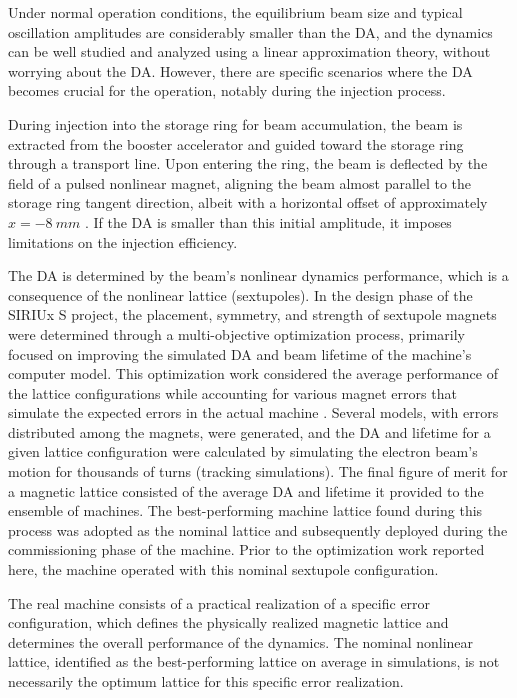 Under normal operation conditions, the equilibrium beam size and typical oscillation amplitudes are considerably smaller than the DA, and the dynamics can be well studied and analyzed using a linear approximation theory, without worrying about the DA. However, there are specific scenarios where the DA becomes crucial for the operation, notably during the injection process.

During injection into the storage ring for beam accumulation, the beam is extracted from the booster accelerator and guided toward the storage ring through a transport line. Upon entering the ring, the beam is deflected by the field of a pulsed nonlinear magnet, aligning the beam almost parallel to the storage ring tangent direction, albeit with a horizontal offset of approximately $x=-8~\unit{mm}$ \cite{liu_injection_2016}. If the DA is smaller than this initial amplitude, it imposes limitations on the injection efficiency.

The DA is determined by the beam's nonlinear dynamics performance, which is a consequence of the nonlinear lattice (sextupoles). In the design phase of the SIRIUx  S project, the placement, symmetry, and strength of sextupole magnets were determined through a multi-objective optimization process, primarily focused on improving the simulated DA and beam lifetime of the machine's computer model\cite{de_sa_optimization_2016, dester_energy_2017}. This optimization work considered the average performance of the lattice configurations while accounting for various magnet errors that simulate the expected errors in the actual machine \cite{de_sa_optimization_2016}. Several models, with errors distributed among the magnets, were generated, and the DA and lifetime for a given lattice configuration were calculated by simulating the electron beam's motion for thousands of turns (tracking simulations). The final figure of merit for a magnetic lattice consisted of the average DA and lifetime it provided to the ensemble of machines. The best-performing machine lattice found during this process was adopted as the nominal lattice and subsequently deployed during the commissioning phase of the machine. Prior to the optimization work reported here, the machine operated with this nominal sextupole configuration.

The real machine consists of a practical realization of a specific error configuration, which defines the physically realized magnetic lattice and determines the overall performance of the dynamics. The nominal nonlinear lattice, identified as the best-performing lattice on average in simulations, is not necessarily the optimum lattice for this specific error realization.

